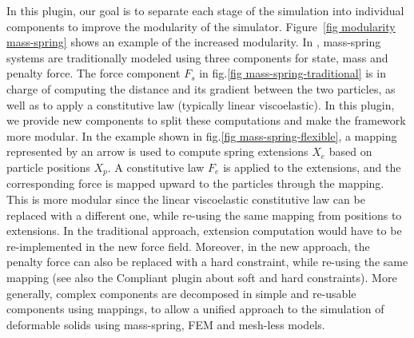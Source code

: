 In this plugin, our goal is to separate each stage of the simulation into individual components to improve the modularity of the simulator.
Figure~\ref{fig modularity mass-spring} shows an example of the increased modularity.
In \sofa{}, mass-spring systems are traditionally modeled using three components for  state, mass and penalty force. 
The force component $F_s$ in fig.\ref{fig mass-spring-traditional} is in charge of computing the distance and its gradient between the two particles, as well as to apply a constitutive law (typically linear viscoelastic).
In this plugin, we provide new components to split these computations and make the framework more modular.
In the example shown in fig.\ref{fig mass-spring-flexible}, a mapping represented by an arrow is used to compute spring extensions $X_e$ based on particle positions $X_p$. 
A constitutive law $F_e$ is applied to the extensions, and the corresponding force is mapped upward to the particles through the mapping.
This is more modular since the linear viscoelastic constitutive law can be replaced with a different one, while re-using the same mapping from positions to extensions. In the traditional approach, extension computation would have to be re-implemented in the new force field.
Moreover, in the new approach, the penalty force can also be replaced with a hard constraint, while re-using the same mapping (see also the Compliant plugin about soft and hard constraints).
More generally, complex components are decomposed in simple and re-usable components using mappings, to allow a unified approach to the simulation of deformable solids using mass-spring, FEM and mesh-less models.
